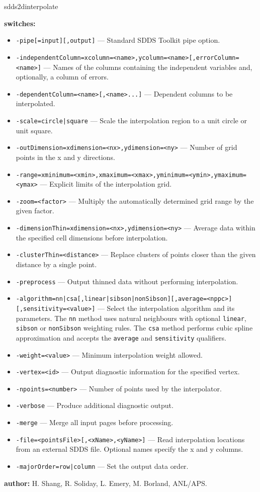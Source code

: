 \begin{sddsprog}{sdds2dinterpolate}
  \item \textbf{switches:}
    \begin{itemize}
    \item \verb|-pipe[=input][,output]| --- Standard SDDS Toolkit pipe option.
    \item \verb|-independentColumn=xcolumn=<name>,ycolumn=<name>[,errorColumn=<name>]| --- Names of the columns containing the independent variables and, optionally, a column of errors.
    \item \verb|-dependentColumn=<name>[,<name>...]| --- Dependent columns to be interpolated.
    \item \verb+-scale=circle|square+ --- Scale the interpolation region to a unit circle or unit square.
    \item \verb|-outDimension=xdimension=<nx>,ydimension=<ny>| --- Number of grid points in the x and y directions.
    \item \verb|-range=xminimum=<xmin>,xmaximum=<xmax>,yminimum=<ymin>,ymaximum=<ymax>| --- Explicit limits of the interpolation grid.
    \item \verb|-zoom=<factor>| --- Multiply the automatically determined grid range by the given factor.
    \item \verb|-dimensionThin=xdimension=<nx>,ydimension=<ny>| --- Average data within the specified cell dimensions before interpolation.
    \item \verb|-clusterThin=<distance>| --- Replace clusters of points closer than the given distance by a single point.
    \item \verb|-preprocess| --- Output thinned data without performing interpolation.
    \item \verb+-algorithm=nn|csa[,linear|sibson|nonSibson][,average=<nppc>][,sensitivity=<value>]+ --- Select the interpolation algorithm and its parameters. The \verb|nn| method uses natural neighbours with optional \verb|linear|, \verb|sibson| or \verb|nonSibson| weighting rules. The \verb|csa| method performs cubic spline approximation and accepts the \verb|average| and \verb|sensitivity| qualifiers.
    \item \verb|-weight=<value>| --- Minimum interpolation weight allowed.
    \item \verb|-vertex=<id>| --- Output diagnostic information for the specified vertex.
    \item \verb|-npoints=<number>| --- Number of points used by the interpolator.
    \item \verb|-verbose| --- Produce additional diagnostic output.
    \item \verb|-merge| --- Merge all input pages before processing.
    \item \verb|-file=<pointsFile>[,<xName>,<yName>]| --- Read interpolation locations from an external SDDS file. Optional names specify the x and y columns.
    \item \verb+-majorOrder=row|column+ --- Set the output data order.
    \end{itemize}
  \item \textbf{author:} H. Shang, R. Soliday, L. Emery, M. Borland, ANL/APS.
\end{sddsprog}
